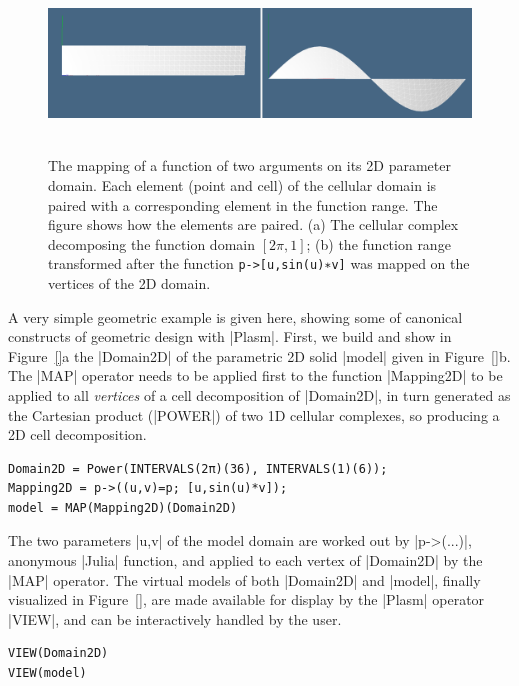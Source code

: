 \begin{coding}

\begin{figure}[htbp]
\centering
   \includegraphics[width=\textwidth]{chapter-01/figs/functionmap.pdf} \hfill~
\caption{The mapping of a function of two arguments on its 2D parameter domain. Each element (point and cell) of the cellular domain is paired with a corresponding element in the function range. The figure shows how the elements are paired. (a) The cellular complex decomposing the function domain $[2\pi,1]$; (b) the function range transformed after the function \texttt{p->[u,sin(u)∗v]} was mapped on the vertices of the 2D domain. }
\label{fig:1:sinmapping}
\end{figure}

A very simple geometric example is given here, showing some of canonical constructs of geometric design with |Plasm|. First, we build and show in Figure~\ref{}a the  |Domain2D| of the parametric 2D solid |model| given in Figure~\ref{}b.  The |MAP| operator needs to be applied first to the function |Mapping2D| to be applied to all \emph{vertices} of a cell decomposition of |Domain2D|, in turn generated as the Cartesian product (|POWER|) of two 1D cellular complexes, so producing a 2D cell decomposition. 

\begin{lstlisting}[language=JuliaLocal, style=julia, mathescape = true] 
Domain2D = Power(INTERVALS(2π)(36), INTERVALS(1)(6));
Mapping2D = p->((u,v)=p; [u,sin(u)*v]);
model = MAP(Mapping2D)(Domain2D)
\end{lstlisting}

The two parameters |u,v| of the model domain are worked out by |p->(...)|, anonymous |Julia| function, and applied to each vertex of |Domain2D| by the |MAP| operator.
The virtual models of both |Domain2D| and |model|, finally visualized in Figure~\ref{}, are made available for display by the |Plasm| operator |VIEW|, and can be interactively handled by the user.

\begin{lstlisting}[language=JuliaLocal, style=julia, mathescape = true] 
VIEW(Domain2D)
VIEW(model)
\end{lstlisting}
\end{coding}







%
%
%
